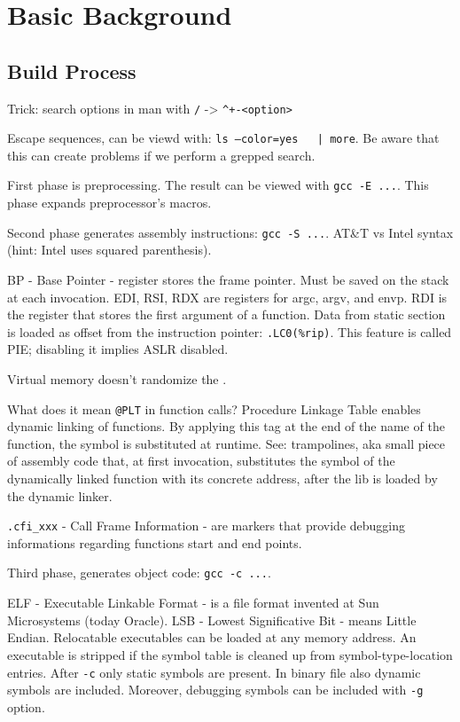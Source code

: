 \chapter{Basic Background}

\section{Build Process}
Trick: search options in man with \texttt{/} -> \texttt{^\s+-<option>}

Escape sequences, can be viewd with: \texttt{ls --color=yes ~ | more}.
Be aware that this can create problems if we perform a grepped search.

First phase is preprocessing. The result can be viewed with \texttt{gcc -E ...}. This phase expands preprocessor's macros.

Second phase generates assembly instructions: \texttt{gcc -S ...}. AT&T vs Intel syntax (hint: Intel uses squared parenthesis).

BP - Base Pointer - register stores the frame pointer. Must be saved on the stack at each invocation.
EDI, RSI, RDX are registers for argc, argv, and envp.
RDI is the register that stores the first argument of a function.
Data from static section is loaded as offset from the instruction pointer: \texttt{.LC0(\%rip)}.
This feature is called PIE; disabling it implies ASLR disabled.

Virtual memory doesn't randomize the .

What does it mean \texttt{@PLT} in function calls? Procedure Linkage Table enables dynamic linking of functions.
By applying this tag at the end of the name of the function, the symbol is substituted at runtime.
See: trampolines, aka small piece of assembly code that, at first invocation, substitutes the symbol of the dynamically linked function with its concrete address, after the lib is loaded by the dynamic linker.

\texttt{.cfi_xxx} - Call Frame Information - are markers that provide debugging informations regarding functions start and end points.

Third phase, generates object code: \texttt{gcc -c ...}.

ELF - Executable Linkable Format - is a file format invented at Sun Microsystems (today Oracle).
LSB - Lowest Significative Bit - means Little Endian.
Relocatable executables can be loaded at any memory address.
An executable is stripped if the symbol table is cleaned up from symbol-type-location entries.
After \texttt{-c} only static symbols are present. In binary file also dynamic symbols are included.
Moreover, debugging symbols can be included with \texttt{-g} option.

